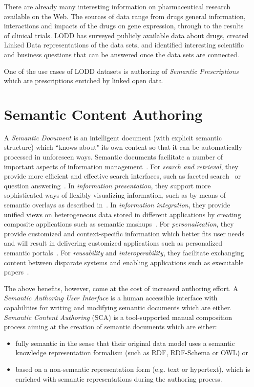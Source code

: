 \documentclass[conference]{IEEEtran}
\begin{document}
There are already many interesting information on pharmaceutical research available on the Web.
The sources of data range from drugs general information, interactions and impacts of the drugs on gene expression, through to the results of clinical trials.
LODD\cite{lodrug} has surveyed publicly available data about drugs, created Linked Data representations of the data sets, and identified interesting scientific and business questions that can be answered once the data sets are connected.

One of the use cases of LODD datasets is authoring of \emph{Semantic Prescriptions} which are prescriptions enriched by linked open data.

\section{Semantic Content Authoring}
\label{sec:sca}
 A \emph{Semantic Document} is an intelligent document (with explicit semantic structure) which ``knows about" its own content so that it can be automatically processed in unforeseen ways.
Semantic documents facilitate a number of important aspects of information management~\cite{rdface}.
For \emph{search and retrieval}, they provide more efficient and effective search interfaces, such as faceted search~\cite{tunkenlang2009faceted} or question answering~\cite{Lopez2011}.
In \emph{information presentation}, they support more sophisticated ways of flexibly visualizing information, such as by means of semantic overlays as described in~\cite{Burel2009}.
In \emph{information integration}, they provide unified views on heterogeneous data stored in different applications by creating composite applications such as semantic mashups~\cite{Ankolekar2007}.
For \emph{personalization}, they provide customized and context-specific information which better fits user needs and will
result in delivering customized applications such as personalized semantic portals~\cite{ecs2007}.
For \emph{reusability} and \emph{interoperability}, they facilitate exchanging content between disparate systems and enabling applications such as executable papers~\cite{Muller2011}.


The above benefits, however, come at the cost of increased authoring effort. %
A \emph{Semantic Authoring User Interface} is a human accessible interface with capabilities for writing and modifying semantic documents which are either.
\emph{Semantic Content Authoring} (SCA) is a tool-supported manual composition process aiming at the creation of semantic documents which are either:
\begin{itemize}
	\item fully semantic in the sense that their original data model uses a semantic knowledge representation formalism (such as RDF, RDF-Schema or OWL) or
	\item based on a non-semantic representation form (e.g. text or hypertext), which is enriched with semantic representations during the authoring process.\\
\end{itemize}
\end{document}
